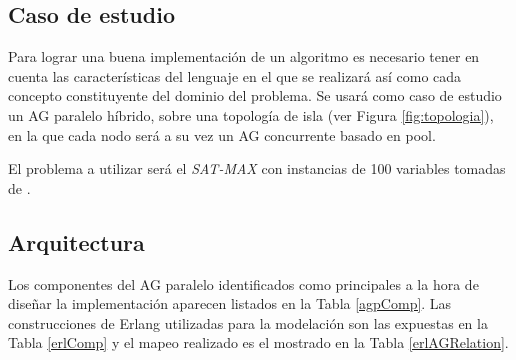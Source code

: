 \subsection{Caso de estudio}

Para lograr una buena implementación de un algoritmo es necesario tener en cuenta las características del lenguaje en el que se realizará así como cada concepto constituyente del dominio del problema. Se usará como caso de estudio un AG paralelo híbrido, sobre una topología de isla (ver Figura \ref{fig:topologia}), en la que cada nodo será a su vez un AG concurrente basado en pool.

El problema a utilizar será el {\em SAT-MAX} con instancias de 100 variables tomadas de \cite{Hoos2000}.

%
%

\subsection{Arquitectura}

Los componentes del AG paralelo identificados como principales a la hora de diseñar la implementación aparecen listados en la Tabla \ref{agpComp}. Las construcciones de Erlang utilizadas para la modelación son las expuestas en la Tabla \ref{erlComp} y el mapeo realizado es el mostrado en la Tabla \ref{erlAGRelation}.


